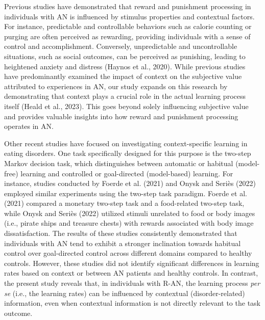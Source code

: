 \documentclass[
  man,floatsintext]{apa6}
\begin{document}
Previous studies have demonstrated that reward and punishment processing in individuals with AN is influenced by stimulus properties and contextual factors. For instance, predictable and controllable behaviors such as calorie counting or purging are often perceived as rewarding, providing individuals with a sense of control and accomplishment. Conversely, unpredictable and uncontrollable situations, such as social outcomes, can be perceived as punishing, leading to heightened anxiety and distress (Haynos et al., 2020). While previous studies have predominantly examined the impact of context on the subjective value attributed to experiences in AN, our study expands on this research by demonstrating that context plays a crucial role in the actual learning process itself (Heald et al., 2023). This goes beyond solely influencing subjective value and provides valuable insights into how reward and punishment processing operates in AN.

Other recent studies have focused on investigating context-specific learning in eating disorders. One task specifically designed for this purpose is the two-step Markov decision task, which distinguishes between automatic or habitual (model-free) learning and controlled or goal-directed (model-based) learning. For instance, studies conducted by Foerde et al. (2021) and Onysk and Seriès (2022) employed similar experiments using the two-step task paradigm. Foerde et al. (2021) compared a monetary two-step task and a food-related two-step task, while Onysk and Seriès (2022) utilized stimuli unrelated to food or body images (i.e., pirate ships and treasure chests) with rewards associated with body image dissatisfaction. The results of these studies consistently demonstrated that individuals with AN tend to exhibit a stronger inclination towards habitual control over goal-directed control across different domains compared to healthy controls. However, these studies did not identify significant differences in learning rates based on context or between AN patients and healthy controls. In contrast, the present study reveals that, in individuals with R-AN, the learning process \emph{per se} (i.e., the learning rates) can be influenced by contextual (disorder-related) information, even when contextual information is not directly relevant to the task outcome.
\end{document}
